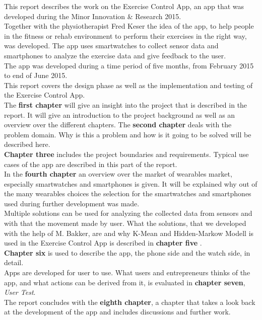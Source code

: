 This report describes the work on the Exercise Control App, an app that was developed during the Minor Innovation \& Research 2015.\\
Together with the physiotherapist Fred Keser the idea of the app, to help people in the fitness or rehab environment to perform their exercises in the right way, was developed. The app uses smartwatches to collect sensor data and smartphones to analyze the exercise data and give feedback to the user. \\
The app was developed during a time period of five months, from February 2015 to end of June 2015. \\
This report covers the design phase as well as the implementation and testing of the Exercise Control App.\\
The \textbf{first chapter} will give an insight into the project that is described in the report. It will give an introduction to the project background as well as an overview over the different chapters.
The \textbf{second chapter} deals with the problem domain. Why is this a problem and how is it going to be solved will be described here.\\
\textbf{Chapter three} includes the project boundaries and requirements. Typical use cases of the app are described in this part of the report.
\\
In the \textbf{fourth chapter} an overview over the market of wearables market, especially smartwatches and smartphones is given. It will be explained why out of the many wearables choices the selection for the smartwatches and smartphones used during further development was made.
\\
 Multiple solutions can be used for analyzing the collected data from sensors and with that the movement made by user. What the solutions, that we developed with the help of M. Bakker, are and why K-Mean and Hidden-Markow Modell is used in the Exercise Control App is described in \textbf{chapter five} .
\\
\textbf{Chapter six} is used to describe the app, the phone side and the watch side, in detail.
\\
Apps are developed for user to use. What users and entrepreneurs thinks of the app, and what actions can be derived from it, is evaluated in \textbf{chapter seven}, \emph{User Test}.
\\
The report concludes with the \textbf{eighth chapter}, a chapter that takes a look back at the development of the app and includes discussions and further work.